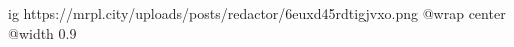  
 
 
 
 

\ifcmt
  ig https://mrpl.city/uploads/posts/redactor/6euxd45rdtigjvxo.png
  @wrap center
  @width 0.9
\fi

